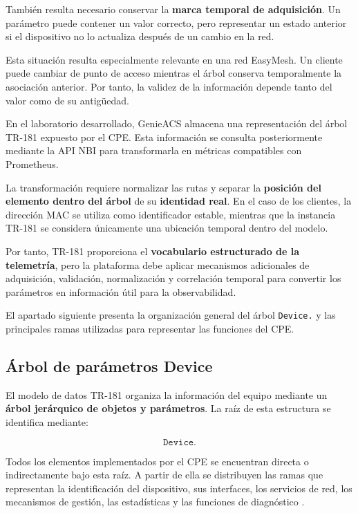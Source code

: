 También resulta necesario conservar la
\textbf{marca temporal de adquisición}. Un parámetro puede contener un
valor correcto, pero representar un estado anterior si el dispositivo no
lo actualiza después de un cambio en la red.

Esta situación resulta especialmente relevante en una red EasyMesh. Un
cliente puede cambiar de punto de acceso mientras el árbol conserva
temporalmente la asociación anterior. Por tanto, la validez de la
información depende tanto del valor como de su antigüedad.

En el laboratorio desarrollado, GenieACS almacena una representación del
árbol TR-181 expuesto por el CPE. Esta información se consulta
posteriormente mediante la API NBI para transformarla en métricas
compatibles con Prometheus.

La transformación requiere normalizar las rutas y separar la
\textbf{posición del elemento dentro del árbol} de su
\textbf{identidad real}. En el caso de los clientes, la dirección MAC se
utiliza como identificador estable, mientras que la instancia TR-181 se
considera únicamente una ubicación temporal dentro del modelo.

Por tanto, TR-181 proporciona el
\textbf{vocabulario estructurado de la telemetría}, pero la plataforma
debe aplicar mecanismos adicionales de adquisición, validación,
normalización y correlación temporal para convertir los parámetros en
información útil para la observabilidad.

El apartado siguiente presenta la organización general del árbol
\texttt{Device.} y las principales ramas utilizadas para representar las
funciones del CPE.

\subsection{Árbol de parámetros Device}
\label{subsec:arbol-parametros-device}

El modelo de datos TR-181 organiza la información del equipo mediante un
\textbf{árbol jerárquico de objetos y parámetros}. La raíz de esta
estructura se identifica mediante:

\[
    \texttt{Device.}
\]

Todos los elementos implementados por el CPE se encuentran directa o
indirectamente bajo esta raíz. A partir de ella se distribuyen las ramas
que representan la identificación del dispositivo, sus interfaces, los
servicios de red, los mecanismos de gestión, las estadísticas y las
funciones de diagnóstico \cite{bbf_tr181}.


